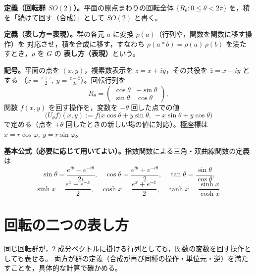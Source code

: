 \documentclass[dvipdfmx, uplatex]{jsarticle}
\theoremstyle{definition}
\begin{document}
\smallskip
\noindent\textbf{定義（回転群 $SO(2)$）。}平面の原点まわりの回転全体
$\{R_\theta:0\le\theta<2\pi\}$ を，積を「続けて回す（合成）」として $SO(2)$ と書く。

\smallskip
\noindent\textbf{定義（表し方＝表現）。}群の各元 $a$ に変換 $\rho(a)$（行列や，関数を関数に移す操作）を
対応させ，積を合成に移す，すなわち $\rho(a\ast b)=\rho(a)\,\rho(b)$ を満たすとき，$\rho$ を $G$ の
\textbf{表し方（表現）}という。

\smallskip
\noindent\textbf{記号。}平面の点を $(x,y)$，複素数表示を $z=x+iy$，その共役を $\bar z=x-iy$ とする
（$x=\tfrac{z+\bar z}{2},\ y=\tfrac{z-\bar z}{2i}$）。回転行列を
\[
    R_\theta=\begin{pmatrix}\cos\theta&-\sin\theta\\ \sin\theta&\cos\theta\end{pmatrix},
\]
関数 $f(x,y)$ を回す操作を，変数を $-\theta$ 回した点での値
\[
    \bigl(U_\theta f\bigr)(x,y):=f\bigl(x\cos\theta+y\sin\theta,\ -x\sin\theta+y\cos\theta\bigr)
\]
で定める（点を $+\theta$ 回したときの新しい場の値に対応）。極座標は $x=r\cos\varphi,\ y=r\sin\varphi$。

\smallskip
\noindent\textbf{基本公式（必要に応じて用いてよい）。}指数関数による三角・双曲線関数の定義は
\[
    \sin\theta=\frac{e^{i\theta}-e^{-i\theta}}{2i},\quad
    \cos\theta=\frac{e^{i\theta}+e^{-i\theta}}{2},\quad
    \tan\theta=\frac{\sin\theta}{\cos\theta},
\]
\[
    \sinh x=\frac{e^{x}-e^{-x}}{2},\quad
    \cosh x=\frac{e^{x}+e^{-x}}{2},\quad
    \tanh x=\frac{\sinh x}{\cosh x}.
\]

\section{回転の二つの表し方}
同じ回転群が，2 成分ベクトルに掛ける行列としても，関数の変数を回す操作としても表せる。
両方が群の定義（合成が再び同種の操作・単位元・逆）を満たすことを，具体的な計算で確かめる。
\end{document}
